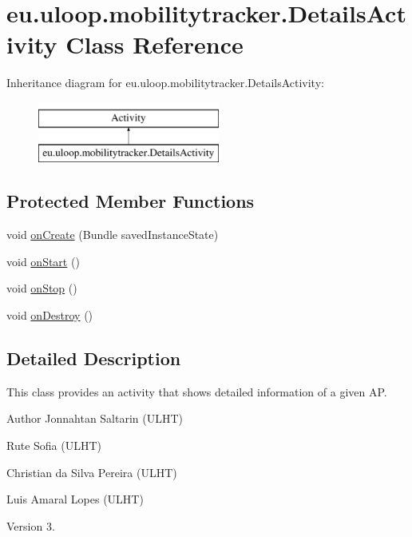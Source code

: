\hypertarget{classeu_1_1uloop_1_1mobilitytracker_1_1DetailsActivity}{\section{eu.\+uloop.\+mobilitytracker.\+Details\+Activity Class Reference}
\label{classeu_1_1uloop_1_1mobilitytracker_1_1DetailsActivity}
}
Inheritance diagram for eu.\+uloop.\+mobilitytracker.\+Details\+Activity\+:\begin{figure}[H]
\begin{center}
\leavevmode
\includegraphics[height=2.000000cm]{classeu_1_1uloop_1_1mobilitytracker_1_1DetailsActivity}
\end{center}
\end{figure}
\subsection*{Protected Member Functions}
\begin{DoxyCompactItemize}
\item 
void \hyperlink{classeu_1_1uloop_1_1mobilitytracker_1_1DetailsActivity_a0b75bac6b06b08a85c9879b820c59ec7}{on\+Create} (Bundle saved\+Instance\+State)
\item 
void \hyperlink{classeu_1_1uloop_1_1mobilitytracker_1_1DetailsActivity_a1a3a01408a7a632c43f2ea12f14c66de}{on\+Start} ()
\item 
void \hyperlink{classeu_1_1uloop_1_1mobilitytracker_1_1DetailsActivity_a440ff757e67eef94d6da34a599c04a96}{on\+Stop} ()
\item 
void \hyperlink{classeu_1_1uloop_1_1mobilitytracker_1_1DetailsActivity_a9c69a0a1329b2ac37a7d86bd344bd86c}{on\+Destroy} ()
\end{DoxyCompactItemize}


\subsection{Detailed Description}
This class provides an activity that shows detailed information of a given A\+P.

\begin{DoxyAuthor}{Author}
Jonnahtan Saltarin (U\+L\+H\+T) 

Rute Sofia (U\+L\+H\+T) 

Christian da Silva Pereira (U\+L\+H\+T) 

Luis Amaral Lopes (U\+L\+H\+T)
\end{DoxyAuthor}
\begin{DoxyVersion}{Version}
3. 
\end{DoxyVersion}


